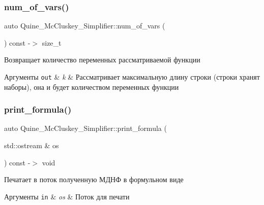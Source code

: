\subsubsection{\texorpdfstring{num\+\_\+of\+\_\+vars()}{num\_of\_vars()}}
{\footnotesize\ttfamily auto Quine\+\_\+\+Mc\+Cluskey\+\_\+\+Simplifier\+::num\+\_\+of\+\_\+vars (\begin{DoxyParamCaption}{ }\end{DoxyParamCaption}) const -\/$>$ size\+\_\+t\hspace{0.3cm}{\ttfamily [private]}}

Возвращает количество переменных рассматриваемой функции 
\begin{DoxyParams}[1]{Аргументы}
\mbox{\tt out}  & {\em k} & Рассматривает максимальную длину строки (строки хранят наборы), она и будет количеством переменных функции \\
\hline
\end{DoxyParams}
\mbox{\label{class_quine___mc_cluskey___simplifier_aa835e7ff9fcad0315af412b92e6c6579}} 
\subsubsection{\texorpdfstring{print\+\_\+formula()}{print\_formula()}}
{\footnotesize\ttfamily auto Quine\+\_\+\+Mc\+Cluskey\+\_\+\+Simplifier\+::print\+\_\+formula (\begin{DoxyParamCaption}\item[{std\+::ostream \&}]{os }\end{DoxyParamCaption}) const -\/$>$ void}

Печатает в поток полученную МДНФ в формульном виде 
\begin{DoxyParams}[1]{Аргументы}
\mbox{\tt in}  & {\em os} & Поток для печати \\
\hline
\end{DoxyParams}
\mbox{\label{class_quine___mc_cluskey___simplifier_ad7097e7ae27b0baa1603a2726f6a33e3}} 
